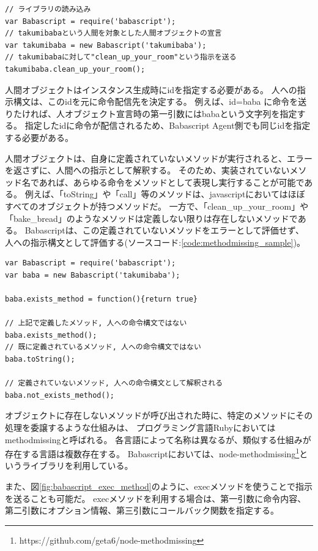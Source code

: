 \begin{lstlisting}[caption=人への指示構文, label=code:babascriptux5fsample]
// ライブラリの読み込み
var Babascript = require('babascript');
// takumibabaという人間を対象とした人間オブジェクトの宣言
var takumibaba = new Babascript('takumibaba');
// takumibabaに対して"clean_up_your_room"という指示を送る
takumibaba.clean_up_your_room();
\end{lstlisting}

人間オブジェクトはインスタンス生成時にidを指定する必要がある。
人への指示構文は、このidを元に命令配信先を決定する。 例えば、id=baba
に命令を送りたければ、人オブジェクト宣言時の第一引数にはbabaという文字列を指定する。
指定したidに命令が配信されるため、Babascript
Agent側でも同じidを指定する必要がある。

人間オブジェクトは、自身に定義されていないメソッドが実行されると、エラーを返さずに、人間への指示として解釈する。
そのため、実装されていないメソッド名であれば、あらゆる命令をメソッドとして表現し実行することが可能である。
例えば、「toString」や「call」等のメソッドは、javascriptにおいてはほぼすべてのオブジェクトが持つメソッドだ。
一方で、「clean\_up\_your\_room」や「bake\_bread」のようなメソッドは定義しない限りは存在しないメソッドである。
Babascriptは、この定義されていないメソッドをエラーとして評価せず、
人への指示構文として評価する(ソースコード:\ref{code:methodmissing_sample})。

\begin{lstlisting}[caption=通常のメソッドと指示構文の例, label=code:methodmissingux5fsample]
var Babascript = require('babascript');
var baba = new Babascript('takumibaba');

baba.exists_method = function(){return true}

// 上記で定義したメソッド, 人への命令構文ではない
baba.exists_method();
// 既に定義されているメソッド, 人への命令構文ではない
baba.toString();

// 定義されていないメソッド, 人への命令構文として解釈される
baba.not_exists_method();
\end{lstlisting}

オブジェクトに存在しないメソッドが呼び出された時に、特定のメソッドにその処理を委譲するような仕組みは、
プログラミング言語Rubyにおいてはmethodmissingと呼ばれる。
各言語によって名称は異なるが、類似する仕組みが存在する言語は複数存在する。
Babascriptにおいては、node-methodmissing\footnote{https://github.com/geta6/node-methodmissing}というライブラリを利用している。

また、図\ref{fig:babascript_exec_method}のように、execメソッドを使うことで指示を送ることも可能だ。
execメソッドを利用する場合は、第一引数に命令内容、第二引数にオプション情報、第三引数にコールバック関数を指定する。

